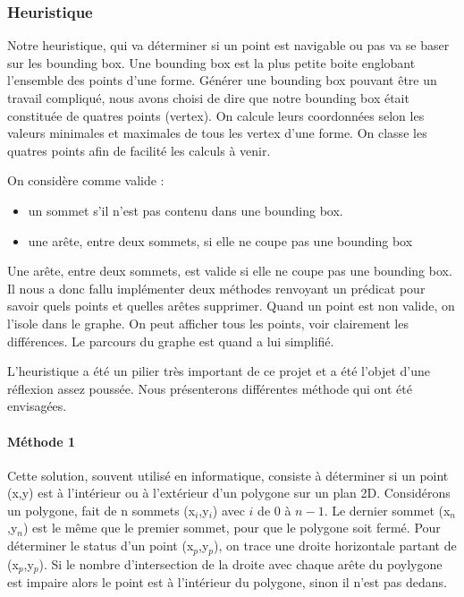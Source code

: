 \documentclass[a4paper,12pt]{report}
\begin{document}
\subsubsection{Heuristique}

Notre heuristique, qui va déterminer si un point est navigable ou pas va se baser sur les bounding box. Une bounding box est la plus petite boite englobant l'ensemble des points d'une forme. Générer une bounding box pouvant être un travail compliqué, nous avons choisi de dire que notre bounding box était constituée de quatres points (vertex). On calcule leurs coordonnées selon les valeurs minimales et maximales de tous les vertex d'une forme. On classe les quatres points afin de facilité les calculs à venir.

On considère comme valide :
\begin{itemize}
 \item un sommet s'il n'est pas contenu dans une bounding box. 
 \item une arête, entre deux sommets, si elle ne coupe pas une bounding box
\end{itemize}

Une arête, entre deux sommets, est valide si elle ne coupe pas une bounding box. Il nous a donc fallu implémenter deux méthodes renvoyant un prédicat pour savoir quels points et quelles arêtes supprimer. 
Quand un point est non valide, on l'isole dans le graphe. On peut afficher tous les points, voir clairement les différences. Le parcours du graphe est quand a lui simplifié.

L'heuristique a été un pilier très important de ce projet et a été l'objet d'une réflexion assez poussée. Nous présenterons différentes méthode qui ont été envisagées.

\paragraph{Méthode 1 }
Cette solution, souvent utilisé en informatique, consiste à déterminer si un point (x,y) est à l'intérieur ou à l'extérieur d'un
polygone sur un plan 2D. 
Considérons un polygone, fait de n sommets (x$_{i}$,y$_{i}$) avec $i$ de $0$ à $n-1$. Le dernier sommet (x$_{n}$,y$_{n}$) est le même que le premier sommet, pour que le polygone soit fermé. 
Pour déterminer le status d'un point (x$_{p}$,y$_{p}$), on trace une droite horizontale partant de (x$_{p}$,y$_{p}$). 
Si le nombre d'intersection de la droite avec chaque arête du poylygone est impaire alors le point est à l'intérieur du polygone, sinon il n'est pas dedans.
\end{document}
